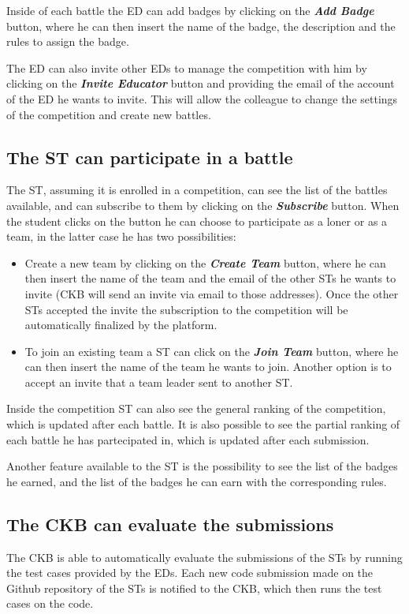 Inside of each battle the ED can add badges by clicking on the \textbf{\textit{Add Badge}} button, where he can then insert the name of the badge, the description and the rules to assign the badge.

The ED can also invite other EDs to manage the competition with him by clicking on the \textbf{\textit{Invite Educator}} button and providing the email of the account of the ED he wants to invite. This will allow the colleague to change the settings of the competition and create new battles.

\subsection*{The ST can participate in a battle}
The ST, assuming it is enrolled in a competition, can see the list of the battles available, and can subscribe to them by clicking on the \textbf{\textit{Subscribe}} button. When the student clicks on the button he can choose to participate as a loner or as a team, in the latter case he has two possibilities: 
\begin{itemize}
  \item Create a new team by clicking on the \textbf{\textit{Create Team}} button, where he can then insert the name of the team and the email of the other STs he wants to invite (CKB will send an invite via email to those addresses). Once the other STs accepted the invite the subscription to the competition will be automatically finalized by the platform.
  \item To join an existing team a ST can click on the \textbf{\textit{Join Team}} button, where he can then insert the name of the team he wants to join. Another option is to accept an invite that a team leader sent to another ST.
\end{itemize}

Inside the competition ST can also see the general ranking of the competition, which is updated after each battle. It is also possible to see the partial ranking of each battle he has partecipated in, which is updated after each submission. 

Another feature available to the ST is the possibility to see the list of the badges he earned, and the list of the badges he can earn with the corresponding rules. 


\subsection*{The CKB can evaluate the submissions}
The CKB is able to automatically evaluate the submissions of the STs by running the test cases provided by the EDs. Each new code submission made on the Github repository of the STs is notified to the CKB, which then runs the test cases on the code.

